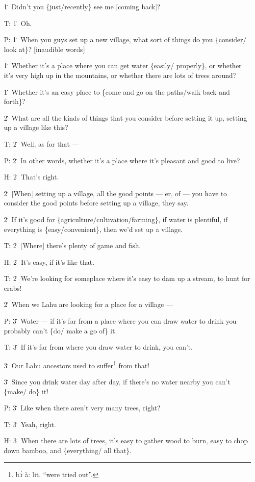1\. Didn't you \{just/recently\} see me [coming back]?

T: 1\. Oh.

P: 1\. When you guys set up a new village, what sort of things do you \{consider/
look at\}? [inaudible words]

1\. Whether it's a place where you can get water \{easily/ properly\}, or whether
it's very high up in the mountains, or whether there are lots of trees around?

1\. Whether it's an easy place to \{come and go on the paths/walk back and forth\}?

2\. What are all the kinds of things that you consider before setting it up, setting
up a village like this?

T: 2\. Well, as for that ---

P: 2\. In other words, whether it's a place where it's pleasant and good to live?

H: 2\. That's right.

2\. [When] setting up a village, all the good points --- er, of --- you have to
consider the good points before setting up a village, they say.

2\. If it's good for \{agriculture/cultivation/farming\}, if water is plentiful,
if everything is \{easy/convenient\}, then we'd set up a village.

T: 2\. [Where] there's plenty of game and fish.

H: 2\. It's easy, if it's like that.

T: 2\. We're looking for someplace where it's easy to dam up a stream, to hunt
for crabs!

2\. When we Lahu are looking for a place for a village ---

P: 3\. Water --- if it's far from a place where you can draw water to drink you
probably can't \{do/ make a go of\} it.

T: 3\. If it's far from where you draw water to drink, you can't.

3\. Our Lahu ancestors used to suffer\footnote{bɔ̀ à: lit. ``were tried out''.} from that!

3\. Since you drink water day after day, if there's no water nearby you can't \{make/
do\} it!

P: 3\. Like when there aren't very many trees, right?

T: 3\. Yeah, right.

H: 3\. When there are lots of trees, it's easy to gather wood to burn, easy to
chop down bamboo, and \{everything/ all that\}.

